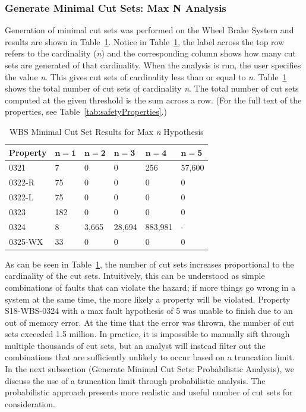 \subsubsection{Generate Minimal Cut Sets: Max N Analysis }
\label{sec:maxN_generate}
Generation of minimal cut sets was performed on the Wheel Brake System and results are shown in Table~\ref{tab:wbs_maxN_results}. Notice in Table~\ref{tab:wbs_maxN_results}, the label across the top row refers to the cardinality (\textit{n}) and the corresponding column shows how many cut sets are generated of that cardinality. When the analysis is run, the user specifies the value \textit{n}. This gives cut sets of cardinality less than or equal to \textit{n}. Table~\ref{tab:wbs_maxN_results} shows the total number of cut sets of cardinality \textit{n}. The total number of cut sets computed at the given threshold is the sum across a row. (For the full text of the properties, see Table~\ref{tab:safetyProperties}.) 


\begin{table}[htbp]
\begin{center}
\caption{WBS Minimal Cut Set Results for Max \textit{n} Hypothesis}
    \begin{tabular}{ | l | l | l | l | l | l |}
    \hline
    \textbf{Property} & $\bm{n = 1}$ & $\bm{n = 2}$ & $\bm{n = 3}$ & $\bm{n = 4}$ 
		& $\bm{n = 5}$    \\ \hline \hline
    0321 & 7 & 0 & 0 & 256 & 57,600   \\ \hline
    0322-R & 75 & 0 & 0 & 0 & 0  \\ \hline
    0322-L & 75 & 0 & 0 & 0 & 0  \\ \hline
    0323 & 182 & 0 & 0 & 0 & 0  \\ \hline
    0324 & 8 & 3,665 & 28,694 & 883,981 & - \\ \hline
    0325-WX & 33 & 0 & 0 &0 &0 \\ \hline
    \end{tabular}
    \label{tab:wbs_maxN_results}
    \end{center}
\end{table}

As can be seen in Table~\ref{tab:wbs_maxN_results}, the number of cut sets increases proportional to the cardinality of the cut sets. Intuitively, this can be understood as simple combinations of faults that can violate the hazard; if more things go wrong in a system at the same time, the more likely a property will be violated. Property S18-WBS-0324 with a max fault hypothesis of 5 was unable to finish due to an out of memory error. At the time that the error was thrown, the number of cut sets exceeded 1.5 million. In practice, it is impossible to manually sift through multiple thousands of cut sets, but an analyst will instead filter out the combinations that are sufficiently unlikely to occur based on a truncation limit. In the next subsection (Generate Minimal Cut Sets: Probabilistic Analysis), we discuss the use of a truncation limit through probabilistic analysis. The probabilistic approach presents more realistic and useful number of cut sets for consideration.

